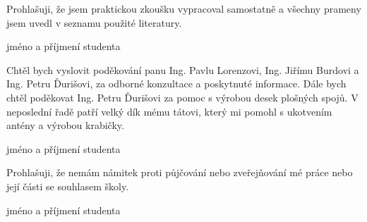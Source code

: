 \setcounter{page}{3}

\clearpage
\thispagestyle{empty}

Prohlašuji, že jsem praktickou zkoušku vypracoval samostatně a všechny prameny jsem uvedl v seznamu použité literatury.
\newline\newline
\begin{flushright}
	\begin{minipage}[H]{6cm}
		\begin{center}
			\dotfill\newline
			jméno a příjmení studenta
		\end{center}		
	\end{minipage}
\end{flushright}	

\vspace*{5cm}

Chtěl bych vyslovit poděkování panu Ing. Pavlu Lorenzovi, Ing. Jiřímu Burdovi a Ing. Petru Ďurišovi, za odborné konzultace a poskytnuté informace. Dále bych chtěl poděkovat Ing. Petru Ďurišovi za pomoc s výrobou desek plošných spojů. V neposlední řadě patří velký dík mému tátovi, který mi pomohl s ukotvením antény a výrobou krabičky.
\newline\newline
\begin{flushright}
	\begin{minipage}[H]{6cm}
		\begin{center}
			\dotfill\newline
			jméno a příjmení studenta
		\end{center}		
	\end{minipage}
\end{flushright}
	

\vspace*{5cm}
	
Prohlašuji, že nemám námitek proti půjčování nebo zveřejňování mé práce nebo její části se souhlasem školy.
\newline\newline
\begin{flushright}
	\begin{minipage}[H]{6cm}
		\begin{center}
			\dotfill\newline
			jméno a příjmení studenta
		\end{center}		
	\end{minipage}
\end{flushright}	
	
	
	


\clearpage
